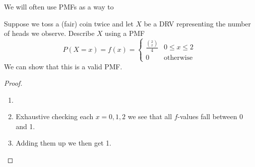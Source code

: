 We will often use PMFs as a way to 


\begin{example}
    Suppose we toss a (fair) coin twice and let $X$ be a DRV representing the number of heads we observe. Describe $X$ using a PMF
    \solution
    \[
        P(X=x)=f(x)=\begin{cases}
             \frac {\binom 2 x} 4 & 0\le x \le 2
            \\
            0 & \text{otherwise}
        \end{cases}
    \]
    We can show that this is a valid PMF.
    \begin{proof}
        \begin{enumerate}
            \item[]
            \item Exhaustive checking each $x=0,1,2$ we see that all $f$-values fall between 0 and 1. 
            \item Adding them up we then get 1.
        \end{enumerate}
    \end{proof}
\end{example}
